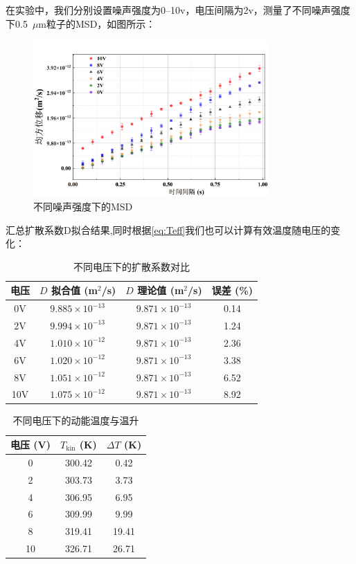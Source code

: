 \documentclass[a4paper]{report} %
\begin{document}
在实验中，我们分别设置噪声强度为0--10v，电压间隔为2v，测量了不同噪声强度下0.5~$\mu$m粒子的MSD，如图所示：\par
\begin{figure}[H]
    \centering
    \includegraphics[width=0.8\textwidth]{不同噪声强度下的MSD.png}
    \caption{不同噪声强度下的MSD}
    \label{fig:msdnoise}
\end{figure}
汇总扩散系数D拟合结果,同时根据\eqref{eq:Teff}我们也可以计算有效温度随电压的变化：
\begin{table}[H]
    \centering
    \caption{不同电压下的扩散系数对比}
    \begin{tabular}{cccc}
        \toprule
        电压 & $D$ 拟合值 (m$^2$/s) & $D$ 理论值 (m$^2$/s) & 误差 (\%) \\
        \midrule
        0V  & $9.885 \times 10^{-13}$ & $9.871 \times 10^{-13}$ & 0.14 \\
        2V  & $9.994 \times 10^{-13}$ & $9.871 \times 10^{-13}$ & 1.24 \\
        4V  & $1.010 \times 10^{-12}$ & $9.871 \times 10^{-13}$ & 2.36 \\
        6V  & $1.020 \times 10^{-12}$ & $9.871 \times 10^{-13}$ & 3.38 \\
        8V  & $1.051 \times 10^{-12}$ & $9.871 \times 10^{-13}$ & 6.52 \\
        10V & $1.075 \times 10^{-12}$ & $9.871 \times 10^{-13}$ & 8.92 \\
        \bottomrule
    \end{tabular}
\end{table}
\begin{table}[H]
    \centering
    \caption{不同电压下的动能温度与温升}
    \begin{tabular}{ccc}
        \toprule
        电压 (V) & $T_{\text{kin}}$ (K) & $\Delta T$ (K) \\
        \midrule
        0  & 300.42 & 0.42 \\
        2  & 303.73 & 3.73 \\
        4  & 306.95 & 6.95 \\
        6  & 309.99 & 9.99 \\
        8  & 319.41 & 19.41 \\
        10 & 326.71 & 26.71 \\
        \bottomrule
    \end{tabular}
\end{table}
\end{document}
